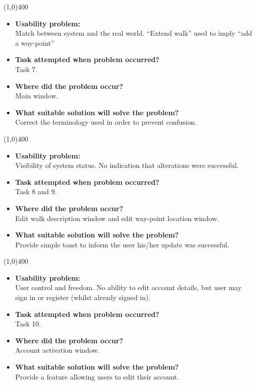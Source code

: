 \documentclass[11pt,a4paper]{article}
\begin{document}
\line(1,0){400}

\begin{itemize}
	\item\textbf{Usability problem:}\\
	Match between system and the real world. ``Extend walk'' used to imply ``add a way-point''

	\item\textbf{Task attempted when problem occurred?}\\
	Task 7.

	\item\textbf{Where did the problem occur?}\\
	Main window.

	\item\textbf{What suitable solution will solve the problem?}\\
	Correct the terminology used in order to prevent confusion.
\end{itemize}

\line(1,0){400}

\begin{itemize}
	\item\textbf{Usability problem:}\\
	Visibility of system status. No indication that alterations were successful.

	\item\textbf{Task attempted when problem occurred?}\\
	Task 8 and 9.

	\item\textbf{Where did the problem occur?}\\
	Edit walk description window and edit way-point location window.

	\item\textbf{What suitable solution will solve the problem?}\\
	Provide simple toast to inform the user his/her update was successful.
\end{itemize}

\line(1,0){400}

\begin{itemize}
	\item\textbf{Usability problem:}\\
	User control and freedom. No ability to edit account details, but user may sign in or register (whilst already signed in).

	\item\textbf{Task attempted when problem occurred?}\\
	Task 10.

	\item\textbf{Where did the problem occur?}\\
	Account activation window.

	\item\textbf{What suitable solution will solve the problem?}\\
	Provide a feature allowing users to edit their account.
\end{itemize}
\end{document}
